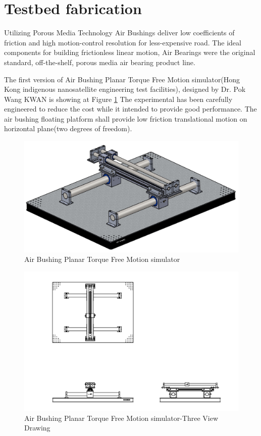 \section{Testbed fabrication}
Utilizing Porous Media Technology Air Bushings deliver low coefficients of friction and high motion-control resolution for less-expensive road. The ideal components for building frictionless linear motion, Air Bearings were the original standard, off-the-shelf, porous media air bearing product line. 

The first version of Air Bushing Planar Torque Free Motion simulator(Hong Kong indigenous nanosatellite engineering test facilities), designed by Dr. Pok Wang KWAN is showing at Figure \ref{MotionSimulator} The experimental has been carefully engineered to reduce the cost while it intended to provide good performance. The air bushing floating platform shall provide low friction translational motion on horizontal plane(two degrees of freedom).

\begin{figure}[H]
\centering
\includegraphics[width=\textwidth]{fig/DOE/Original3DView}
\caption{Air Bushing Planar Torque Free Motion simulator}\label{MotionSimulator}
\end{figure}

\begin{figure}[H]
\centering
\includegraphics[width=\textwidth]{fig/DOE/3viewdrawing}
\caption{Air Bushing Planar Torque Free Motion simulator-Three View Drawing}
\end{figure}

